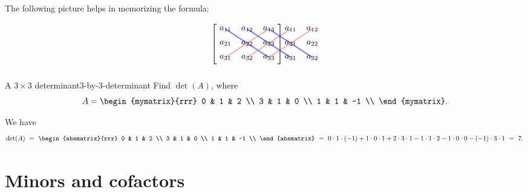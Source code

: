 The following picture helps in memorizing the formula:
\begin{equation*}
  \begin{tikzpicture}[yscale=0.6,xscale=0.9]
    \draw[ultra thick,red!30] (1,-3) -- (3,-1);
    \draw[ultra thick,red!30] (2,-3) -- (4,-1);
    \draw[ultra thick,red!30] (3,-3) -- (5,-1);
    \draw[ultra thick,blue!50] (1,-1) -- (3,-3);
    \draw[ultra thick,blue!50] (2,-1) -- (4,-3);
    \draw[ultra thick,blue!50] (3,-1) -- (5,-3);
    \foreach\i in {1,2,3} {
      \foreach\j in {1,2,3} {
        \path (\j,-\i) node {$a_{\i\j}$};
      }
    }
    \foreach\i in {1,2,3} {
      \foreach\j in {1,2} {
        \path (\j,-\i) + (3,0) node {$a_{\i\j}$};
      }
    }
    \draw(0.5,-2) node {$\left[\rule{0mm}{1.0cm}\right.$};
    \draw(3.5,-2) node {$\left.\rule{0mm}{1.0cm}\right]$};
  \end{tikzpicture}
\end{equation*}

\begin{example}{A $3\times 3$ determinant}{3-by-3-determinant}
  Find $\det(A)$, where
  \begin{equation*}
    A = \begin{mymatrix}{rrr}
      0 & 1 & 2 \\
      3 & 1 & 0 \\
      1 & 1 & -1 \\
    \end{mymatrix}.
  \end{equation*}
\end{example}

\begin{solution}
  We have
  \begin{equation*}
    \det(A) ~=~
    \begin{absmatrix}{rrr}
      0 & 1 & 2 \\
      3 & 1 & 0 \\
      1 & 1 & -1 \\
    \end{absmatrix}
    ~=~
    0\cdot 1\cdot (-1)
    + 1\cdot 0 \cdot 1
    + 2 \cdot 3 \cdot 1
    - 1\cdot 1\cdot 2
    - 1\cdot 0\cdot 0
    - (-1)\cdot 3\cdot 1
    ~=~ 7.
  \end{equation*}
\end{solution}

\section{Minors and cofactors}

